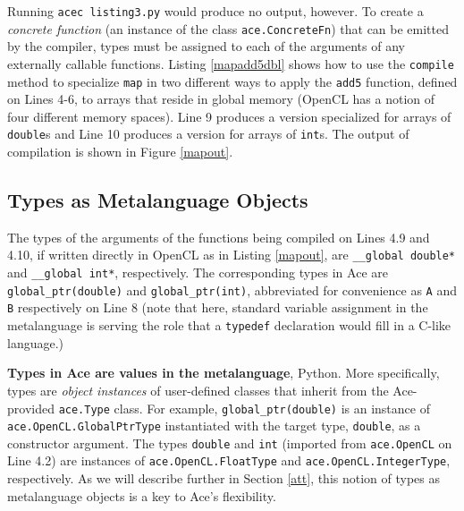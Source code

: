\documentclass[10pt]{sigplanconf}
\begin{document}
Running \verb|acec listing3.py| would produce no output, however. To create a {\em concrete function} (an instance of the class \verb|ace.ConcreteFn|) that can be emitted by the compiler, types must be assigned to each of the arguments of any externally callable functions. Listing \ref{mapadd5dbl} shows how to use the \verb|compile| method to specialize \verb|map| in two different ways to apply the \verb|add5| function, defined on Lines 4-6, to arrays  that reside in global memory (OpenCL has a notion of four different memory spaces). Line 9 produces a version specialized for arrays of \verb|double|s and Line 10 produces a version for arrays of \verb|int|s. The output of compilation is shown in Figure \ref{mapout}.

\subsection{Types as Metalanguage Objects}
The types of the arguments of the functions being compiled on Lines 4.9 and 4.10, if written directly in OpenCL as in Listing \ref{mapout}, are \verb|__global double*| and \verb|__global int*|, respectively. The corresponding types in Ace are \verb|global_ptr(double)| and \verb|global_ptr(int)|, abbreviated for convenience as \verb|A| and \verb|B| respectively on Line 8 (note that here, standard variable assignment in the metalanguage is serving the role that a \verb|typedef| declaration would fill in a C-like language.)

\textbf{Types in Ace are values in the metalanguage}, Python. More specifically, types are {\em object instances} of user-defined classes that inherit from the Ace-provided \verb|ace.Type| class. For example, \verb|global_ptr(double)| is an instance of \verb|ace.OpenCL.GlobalPtrType| instantiated with the target type, \verb|double|, as a constructor argument. The types \verb|double| and \verb|int| (imported from \verb|ace.OpenCL| on Line 4.2) are instances of \verb|ace.OpenCL.FloatType| and \verb|ace.OpenCL.IntegerType|, respectively. As we will describe further in Section \ref{att}, this notion of types as metalanguage objects is a key to Ace's flexibility.
\end{document}
